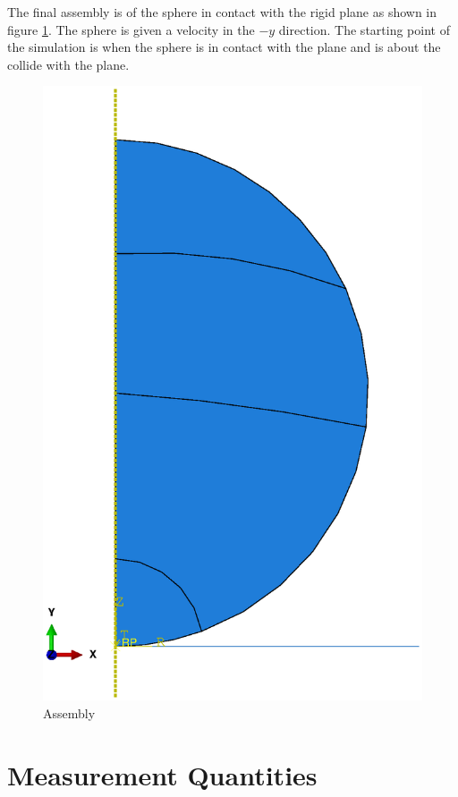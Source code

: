 The final assembly is of the sphere in contact with the rigid plane as shown in figure \ref{fig:assembly}. The sphere is given a velocity in the $-y$ direction. The starting point of the simulation is when the sphere is in contact with the plane and is about the collide with the plane.
\begin{figure}[H]
    \centering
	\includegraphics[scale=0.5]{../images/SimulationSetup/Assembly.eps}
	\caption{Assembly}
	\label{fig:assembly}
\end{figure}



\section{Measurement Quantities}

